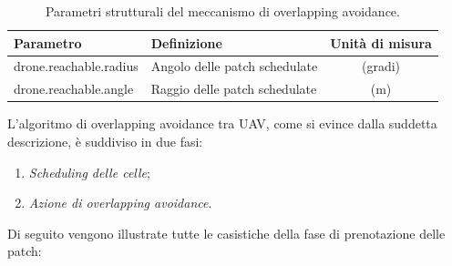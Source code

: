 \begin{table}[H]
    \centering
    \captionsetup{justification=centering, margin=2cm, font=footnotesize}
    \begin{tabular}{|l|l|c|}
    \hline
    \textbf{Parametro}              & \textbf{Definizione}                      & \textbf{Unità di misura}      \\ \hline
    drone.reachable.radius          & Angolo delle patch schedulate             & (gradi)                       \\ \hline
    drone.reachable.angle           & Raggio delle patch schedulate             & (m)                           \\ \hline
    \end{tabular}%
    \caption{Parametri strutturali del meccanismo di overlapping avoidance.}
    \label{tabella_obstacle_avoidance}
\end{table}

L'algoritmo di overlapping avoidance tra UAV, come si evince dalla suddetta descrizione, è suddiviso in due fasi:

\begin{enumerate}
    \item \textit{Scheduling delle celle};
    \item \textit{Azione di overlapping avoidance}.
\end{enumerate}

Di seguito vengono illustrate tutte le casistiche della fase di prenotazione delle patch:

